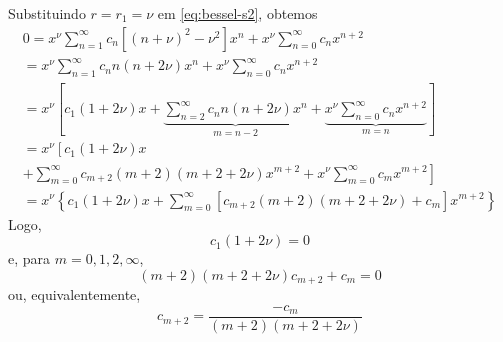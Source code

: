 Substituindo $r=r_1=\nu$ em \eqref{eq:bessel-s2}, obtemos
\begin{gather}
  0 = x^\nu\sum_{n=1}^\infty c_n\left[(n+\nu)^2-\nu^2\right]x^n + x^\nu\sum_{n=0}^\infty c_nx^{n+2}\\
  =  x^\nu\sum_{n=1}^\infty c_nn(n+2\nu)x^n + x^\nu\sum_{n=0}^\infty c_nx^{n+2}\\
  = x^\nu\left[c_1(1+2\nu)x + \underbrace{\sum_{n=2}^\infty c_nn(n+2\nu)x^n}_{m=n-2} + \underbrace{x^\nu\sum_{n=0}^\infty c_nx^{n+2}}_{m=n}\right]\\
  = x^\nu\left[c_1(1+2\nu)x \right.\\
    \left. + \sum_{m=0}^\infty c_{m+2}(m+2)(m+2+2\nu)x^{m+2} + x^\nu\sum_{m=0}^\infty c_mx^{m+2}\right]\\
  = x^\nu\left\{c_1(1+2\nu)x + \sum_{m=0}^\infty \left[c_{m+2}(m+2)(m+2+2\nu) + c_m\right]x^{m+2}\right\}
\end{gather}
Logo,
\begin{equation}
  c_1(1+2\nu) = 0
\end{equation}
e, para $m=0,1,2,\infty$,
\begin{equation}
  (m+2)(m+2+2\nu)c_{m+2}+c_m = 0
\end{equation}
ou, equivalentemente,
\begin{equation}
  c_{m+2} = \frac{-c_m}{(m+2)(m+2+2\nu)}
\end{equation}

